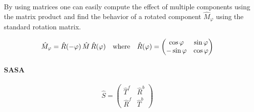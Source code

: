\noindent
By using matrices one can easily compute the effect of multiple components using the matrix product and find the behavior of a rotated component $\hat{M}_{\varphi}$ using the standard rotation matrix.

\begin{equation}
    \hat{M}_{\varphi} = \hat{R}(-\varphi) \, \hat{M} \, \hat{R}(\varphi)
    \qq{where}
    \hat{R}(\varphi) =
    \begin{pmatrix}
        \cos \varphi & \sin \varphi \\
        -\sin \varphi & \cos \varphi
    \end{pmatrix}
\end{equation}
\paragraph{SASA}

\begin{equation}
    \hat{S} =
    \begin{pmatrix}
        \hat{T}^f & \hat{R}^b \\
        \hat{R}^f & \hat{T}^b
    \end{pmatrix}
\end{equation}



